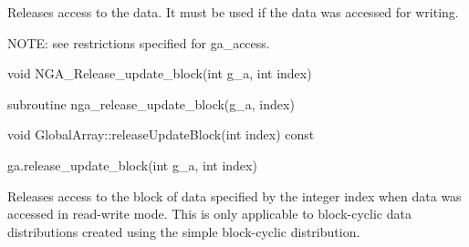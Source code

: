 \documentclass[12pt]{article}
\begin{document}
\local

\begin{desc}

Releases access to the data. It must be used if the data was accessed for
writing.

NOTE: see restrictions specified for ga_access.

\end{desc}



\begin{capi}
\begin{ccode}
void NGA_Release_update_block(int g_a, int index)
\end{ccode}
\begin{funcargs}
\end{funcargs}
\end{capi}

\begin{fapi}
\begin{fcode}
subroutine nga_release_update_block(g_a, index)
\end{fcode}
\begin{funcargs}
\end{funcargs}
\end{fapi}

\begin{cxxapi}
\begin{cxxcode}
void GlobalArray::releaseUpdateBlock(int index) const
\end{cxxcode}
\begin{funcargs}
\end{funcargs}
\end{cxxapi}

\begin{pyapi}
\begin{pycode}
ga.release_update_block(int g_a, int index)
\end{pycode}
\begin{funcargs}
\end{funcargs}
\end{pyapi}

\local

\begin{desc}

Releases access to the block of data specified by the integer index when data
was accessed in read-write mode. This is only applicable to block-cyclic data
distributions created using the simple block-cyclic distribution.

\end{desc}
\end{document}
